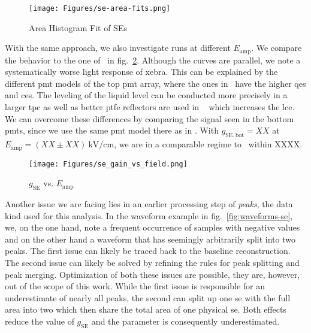\begin{figure}
    \centering
    \texttt{[image: Figures/se-area-fits.png]}  %
    \caption[Area Histogram Fit of SEs]{
        Area Histogram Fit of SEs
    }
    \label{fig:se-area-fits}
\end{figure}

With the same approach, we also investigate runs at different $ E_\mathrm{amp} $.
We compare the behavior to the one of \oneton~in fig.~\ref{fig:seg-vs-field}.
Although the curves are parallel, we note a systematically worse light response of \gls{xebra}.  %
This can be explained by the different \gls{pmt} models of the top \gls{pmt} array, where the ones in \oneton~have the higher \glspl{qe} and \glspl{ce}.
The leveling of the liquid level can be conducted more precisely in a larger \gls{tpc} as well as better \gls{ptfe} reflectors are used in \oneton~ which increases the \gls{lce}.
We can overcome these differences by comparing the signal seen in the bottom \glspl{pmt}, since we use the same \gls{pmt} model there as in \oneton.
With $ g_\mathrm{SE, bot} = XX $ at $ E_\mathrm{amp} = \left( XX \pm XX \right) \SI{}{\kilo\volt\per\centi\meter} $, we are in a comparable regime to \oneton~within XXXX.  %


\begin{figure}
    \centering
    \texttt{[image: Figures/se\_gain\_vs\_field.png]}  %
    \caption[\oneton~comparison of Amplification Gain vs. Fieldstrength]{
        $ g_\mathrm{SE} $ vs. $ E_\mathrm{amp} $
    }
    \label{fig:seg-vs-field}
\end{figure}


Another issue we are facing lies in an earlier processing step of \emph{peaks}, the data kind used for this analysis.
In the waveform example in fig.~\ref{fig:waveforms-se}, we, on the one hand, note a frequent occurrence of samples with negative values and on the other hand a waveform that has seemingly arbitrarily split into two peaks.
The first issue can likely be traced back to the baseline reconstruction.
The second issue can likely be solved by refining the rules for peak splitting and peak merging.
Optimization of both these issues are possible, they are, however, out of the scope of this work.
While the first issue is responsible for an underestimate of nearly all peaks, the second can split up one \gls{se} with the full area into two which then share the total area of one physical \gls{se}.
Both effects reduce the value of $ g_\mathrm{SE} $ and the parameter is consequently underestimated.


